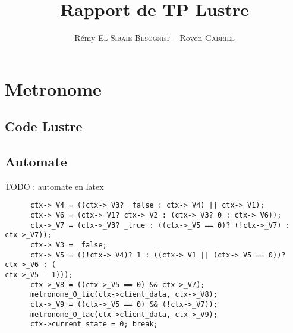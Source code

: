 \documentclass[a4paper]{article}
\title{Rapport de TP Lustre}
\author{Rémy \textsc{El-Sibaie Besognet} -- Roven \textsc{Gabriel}}
\begin{document}
\maketitle

\section{Metronome}

\subsection{Code Lustre}
\subsection{Automate}

TODO : automate en latex

\begin{verbatim}
      ctx->_V4 = ((ctx->_V3? _false : ctx->_V4) || ctx->_V1);
      ctx->_V6 = (ctx->_V1? ctx->_V2 : (ctx->_V3? 0 : ctx->_V6));
      ctx->_V7 = (ctx->_V3? _true : ((ctx->_V5 == 0)? (!ctx->_V7) : ctx->_V7));
      ctx->_V3 = _false;
      ctx->_V5 = ((!ctx->_V4)? 1 : ((ctx->_V1 || (ctx->_V5 == 0))? ctx->_V6 : (
ctx->_V5 - 1)));
      ctx->_V8 = ((ctx->_V5 == 0) && ctx->_V7);
      metronome_O_tic(ctx->client_data, ctx->_V8);
      ctx->_V9 = ((ctx->_V5 == 0) && (!ctx->_V7));
      metronome_O_tac(ctx->client_data, ctx->_V9);
      ctx->current_state = 0; break;
\end{verbatim}
\end{document}

